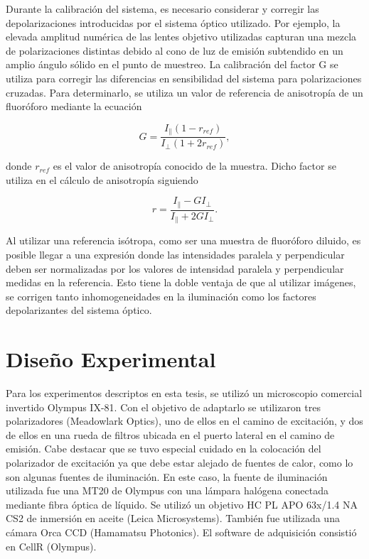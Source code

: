 Durante la calibración del sistema, es necesario considerar y corregir las depolarizaciones introducidas por el sistema óptico utilizado. Por ejemplo, la elevada amplitud numérica de las lentes objetivo utilizadas capturan una mezcla de polarizaciones distintas debido al cono de luz de emisión subtendido en un amplio ángulo sólido en el punto de muestreo. La calibración del factor G se utiliza para corregir las diferencias en sensibilidad del sistema para polarizaciones cruzadas. Para determinarlo, se utiliza un valor de referencia de anisotropía de un fluoróforo mediante la ecuación

\begin{equation}
    G = \frac{I_{\parallel} (1 - r_{ref})}{I_{\perp} (1 + 2r_{ref})},
\end{equation}

\noindent donde $r_{ref}$ es el valor de anisotropía conocido de la muestra. Dicho factor se utiliza en el cálculo de anisotropía siguiendo

\begin{equation}
    r = \frac{I_{\parallel} - G I_{\perp}}{I_{\parallel} + 2 G I_{\perp}}.
\end{equation}

\noindent Al utilizar una referencia isótropa, como ser una muestra de fluoróforo diluido, es posible llegar a una expresión donde las intensidades paralela y perpendicular deben ser normalizadas por los valores de intensidad paralela y perpendicular medidas en la referencia. Esto tiene la doble ventaja de que al utilizar imágenes, se corrigen tanto inhomogeneidades en la iluminación como los factores depolarizantes del sistema óptico.


\section{Diseño Experimental}


Para los experimentos descriptos en esta tesis, se utilizó un microscopio comercial invertido Olympus IX-81. Con el objetivo de adaptarlo se utilizaron tres polarizadores (Meadowlark Optics), uno de ellos en el camino de excitación, y dos de ellos en una rueda de filtros ubicada en el puerto lateral en el camino de emisión. Cabe destacar que se tuvo especial cuidado en la colocación del polarizador de excitación ya que debe estar alejado de fuentes de calor, como lo son algunas fuentes de iluminación. En este caso, la fuente de iluminación utilizada fue una MT20 de Olympus con una lámpara halógena conectada mediante fibra óptica de líquido. Se utilizó un objetivo HC PL APO 63x/1.4 NA CS2 de inmersión en aceite (Leica Microsystems). También fue utilizada una cámara Orca CCD (Hamamatsu Photonics). El software de adquisición consistió en CellR (Olympus).

